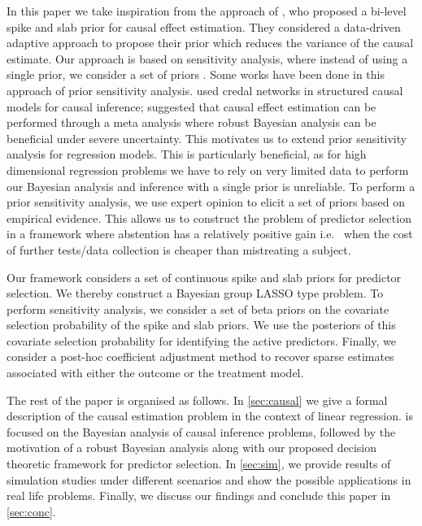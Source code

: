\documentclass[preprint,12pt]{elsarticle}
\begin{document}
In this paper we take inspiration from the approach of \citet{koch2020}, who proposed a bi-level spike and slab prior for causal effect 
estimation. They considered a data-driven adaptive approach to
propose their prior which reduces the variance of the causal estimate. 
Our approach is based on
sensitivity analysis, where instead of using a single prior, 
we consider a set of priors \citep{BERGER1990303}. %
Some works have been done in this approach of
prior sensitivity analysis. \citet{zaffalon20a} 
used credal networks in structured causal models
for causal inference; \citet{raices_cruz22} suggested
that causal effect estimation can be performed 
through a meta analysis where robust Bayesian analysis 
can be beneficial under severe uncertainty. 
This motivates us to extend prior sensitivity analysis for 
regression models. This is particularly beneficial, as for high dimensional regression problems 
we have to rely on very limited data to perform our Bayesian analysis and 
inference with a single prior
is unreliable.
To perform a prior sensitivity analysis, we use expert opinion to elicit a set of priors 
based on empirical evidence. 
This allows us to construct the problem of 
predictor selection
in a framework where abstention has a relatively positive gain i.e.~
when the cost of further tests/data collection is cheaper than
mistreating a subject.

Our framework considers a set of continuous spike and slab priors 
\citep{ishwaran2005} for
predictor selection.
We thereby construct a Bayesian group LASSO \citep{xu2015} type problem.
To perform sensitivity analysis,
we consider a set of beta priors on the covariate selection 
probability of the spike and slab priors. We use the posteriors of this
covariate selection probability for identifying the active predictors. Finally, 
we consider a post-hoc coefficient adjustment method \citep{hahn2015}
to recover sparse estimates associated with either the outcome or the
treatment model. 

The rest of the paper is organised as follows. In \cref{sec:causal}
we give a formal description of the causal estimation problem in the
context of linear regression.  is focused on the
Bayesian analysis of causal inference problems, followed by the
motivation of a robust Bayesian analysis along with our proposed decision 
theoretic framework for predictor selection. In \cref{sec:sim}, 
we provide results of simulation studies under different scenarios 
and show the possible applications in real life problems. Finally, 
we discuss our findings and conclude this paper in \cref{sec:conc}.
\end{document}
